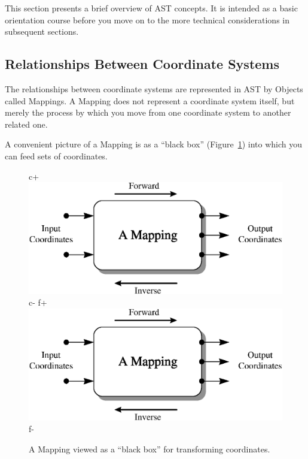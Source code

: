 \documentclass[twoside,11pt]{article}
\newenvironment{latexonly}{}{}
\begin{document}
This section presents a brief overview of AST concepts. It is intended
as a basic orientation course before you move on to the more technical
considerations in subsequent sections.

\subsection{\label{ss:mappingoverview}Relationships Between Coordinate Systems}

The relationships between coordinate systems are represented in AST by
Objects called Mappings. A Mapping does not represent a coordinate
system itself, but merely the process by which you move from one
coordinate system to another related one.

\begin{latexonly}
   A convenient picture of a Mapping is as a ``black box''
   (Figure~\ref{fig:mapping}) into which you can feed sets of
   coordinates.
   \begin{figure}[bhtp]
   \begin{center}
c+
   \includegraphics[scale=0.7]{sun211_figures/mapping.eps}
c-
f+
   \includegraphics[scale=0.7]{sun210_figures/mapping.eps}
f-
   \caption{A Mapping viewed as a ``black box'' for transforming coordinates.}
   \label{fig:mapping}
   \end{center}
   \end{figure}
\end{latexonly}
\end{document}
